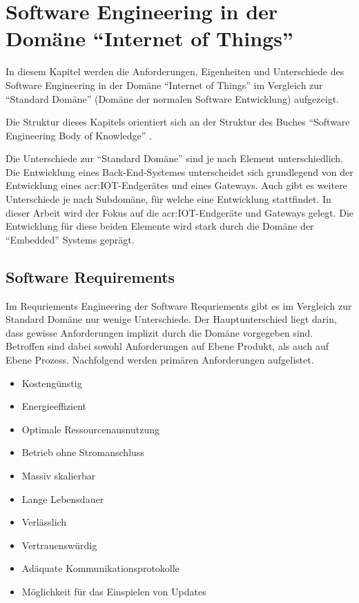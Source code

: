 \chapter{Software Engineering in der Domäne "`Internet of Things"'} \label{chap:sweInIot}
In diesem Kapitel werden die Anforderungen, Eigenheiten und Unterschiede des Software Engineering in der Domäne "`Internet of Things"' im Vergleich zur "`Standard Domäne"' (Domäne der normalen Software Entwicklung) aufgezeigt.

Die Struktur dieses Kapitels orientiert sich an der Struktur des Buches "`Software Engineering Body of Knowledge"' \cite{B:IEEE:SWEBOOK}.

Die Unterschiede zur "`Standard Domäne"' sind je nach Element unterschiedlich. Die Entwicklung eines Back-End-Systemes unterscheidet sich grundlegend von der Entwicklung eines \gls{acr:IOT}-Endgerätes und eines Gateways. Auch gibt es weitere Unterschiede je nach Subdomäne, für welche eine Entwicklung stattfindet. In dieser Arbeit wird der Fokus auf die \gls{acr:IOT}-Endgeräte und Gateways gelegt. Die Entwicklung für diese beiden Elemente wird stark durch die Domäne der "`Embedded"' Systems geprägt.



\section{Software Requirements}
Im Requriements Engineering der Software Requriements gibt es im Vergleich zur Standard Domäne nur wenige Unterschiede. Der Hauptunterschied liegt darin, dass gewisse Anforderungen implizit durch die Domäne vorgegeben sind. Betroffen sind dabei sowohl Anforderungen auf Ebene Produkt, als auch auf Ebene Prozess. Nachfolgend werden primären Anforderungen aufgelistet.

\begin{itemize}
\item Kostengünstig
\item Energieeffizient
\item Optimale Ressourcenausnutzung
\item Betrieb ohne Stromanschluss
\item Massiv skalierbar
\item Lange Lebensdauer
\item Verlässlich
\item Vertrauenswürdig
\item Adäquate Kommunikationsprotokolle
\item Möglichkeit für das Einspielen von Updates
\end{itemize}


